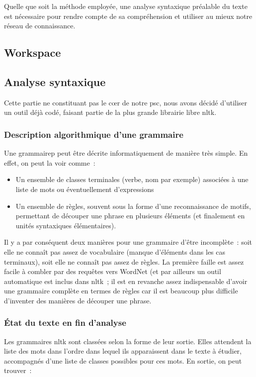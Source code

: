 \documentclass[a4paper,12pt]{article}
\begin{document}
Quelle que soit la méthode employée, une analyse syntaxique préalable du texte est nécessaire pour rendre compte de sa compréhension et utiliser au mieux notre réseau de connaissance.

\subsection{Workspace}


\subsection{Analyse syntaxique}

Cette partie ne constituant pas le c\oe{}r de notre psc, nous avons décidé d'utiliser un outil déjà codé, faisant partie de la plus grande librairie libre nltk.

\subsubsection{Description algorithmique d'une grammaire}
Une grammairep peut être décrite informatiquement de manière très simple. En effet, on peut la voir comme~:
\begin{itemize}
	\item Un ensemble de classes terminales (verbe, nom par exemple) associées à une liste de mots ou éventuellement d'expressions
	\item Un ensemble de règles, souvent sous la forme d'une reconnaissance de motifs, permettant de découper une phrase en plusieurs éléments (et finalement en unités syntaxiques élémentaires).
\end{itemize}

Il y a par conséquent deux manières pour une grammaire d'être incomplète~: soit elle ne connaît pas assez de vocabulaire (manque d'éléments dans les cas terminaux), soit elle ne connaît pas assez de règles. La première faille est assez facile à combler par des requêtes vers WordNet (et par ailleurs un outil automatique est inclus dans nltk~; il est en revanche assez indispensable d'avoir une grammaire complète en termes de règles car il est beaucoup plus difficile d'inventer des manières de découper une phrase.

\subsubsection{\'Etat du texte en fin d'analyse}
Les grammaires nltk sont classées selon la forme de leur sortie. Elles attendent la liste des mots dans l'ordre dans lequel ils apparaissent dans le texte à étudier, accompagnés d'une liste de classes possibles pour ces mots. En sortie, on peut trouver~:
\end{document}
